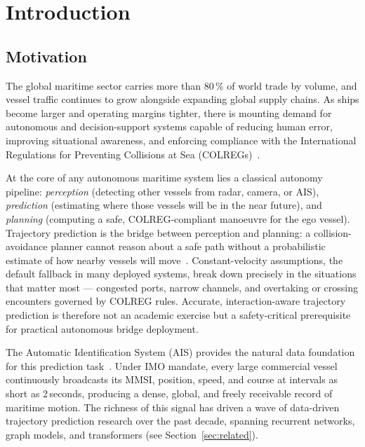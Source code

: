 \documentclass[12pt, a4paper]{article}
\begin{document}
  \newpage
  \tableofcontents
  \newpage

  \section{Introduction}
  \label{sec:intro}

  \subsection{Motivation}

  The global maritime sector carries more than 80\,\% of world trade by volume, and vessel
  traffic continues to grow alongside expanding global supply chains.  As ships become larger
  and operating margins tighter, there is mounting demand for autonomous and decision-support
  systems capable of reducing human error, improving situational awareness, and enforcing
  compliance with the International Regulations for Preventing Collisions at Sea
  (COLREGs)~\citep{colregs1972}.

  At the core of any autonomous maritime system lies a classical autonomy pipeline:
  \textit{perception} (detecting other vessels from radar, camera, or AIS),
  \textit{prediction} (estimating where those vessels will be in the near future), and
  \textit{planning} (computing a safe, COLREG-compliant manoeuvre for the ego vessel).
  Trajectory prediction is the bridge between perception and planning: a collision-avoidance
  planner cannot reason about a safe path without a probabilistic estimate of how nearby
  vessels will move~\citep{kuwata2014safe, vagale2021path, mahipala2025colreg}.
  Constant-velocity assumptions, the default fallback in many deployed systems, break down
  precisely in the situations that matter most — congested ports, narrow channels, and
  overtaking or crossing encounters governed by COLREG rules.  Accurate, interaction-aware
  trajectory prediction is therefore not an academic exercise but a safety-critical
  prerequisite for practical autonomous bridge deployment.

  The Automatic Identification System (AIS) provides the natural data foundation for
  this prediction task~\citep{itu2014ais}.  Under IMO mandate, every large commercial
  vessel continuously broadcasts its MMSI, position, speed, and course at intervals as
  short as 2\,seconds, producing a dense, global, and freely receivable record of maritime
  motion.  The richness of this signal has driven a wave of data-driven trajectory
  prediction research over the past decade, spanning recurrent networks, graph models,
  and transformers (see Section~\ref{sec:related}).
\end{document}
